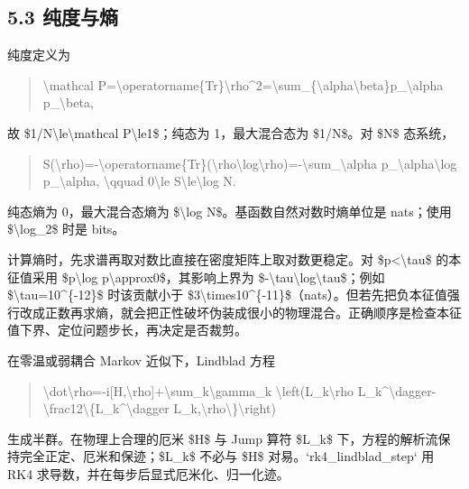\documentclass[UTF8,openany,11pt,fontset=fandol]{ctexbook}
\begin{document}
\subsection{\texorpdfstring{\textbf{5.3
纯度与熵}}{5.3 纯度与熵}}\label{ux7eafux5ea6ux4e0eux71b5}

纯度定义为

\begin{quote}
\textbackslash mathcal
P=\textbackslash operatorname\{Tr\}\textbackslash rho\^{}2=\textbackslash sum\_\{\textbackslash alpha\textbackslash beta\}p\_\textbackslash alpha
p\_\textbackslash beta,
\end{quote}

故 \$1/N\textbackslash le\textbackslash mathcal
P\textbackslash le1\$；纯态为 1，最大混合态为 \$1/N\$。对 \$N\$ 态系统，

\begin{quote}
S(\textbackslash rho)=-\textbackslash operatorname\{Tr\}(\textbackslash rho\textbackslash log\textbackslash rho)=-\textbackslash sum\_\textbackslash alpha
p\_\textbackslash alpha\textbackslash log p\_\textbackslash alpha,
\textbackslash qquad 0\textbackslash le
S\textbackslash le\textbackslash log N.
\end{quote}

纯态熵为 0，最大混合态熵为 \$\textbackslash log
N\$。基函数自然对数时熵单位是 nats；使用 \$\textbackslash log\_2\$ 时是
bits。

计算熵时，先求谱再取对数比直接在密度矩阵上取对数更稳定。对
\$p\textless\textbackslash tau\$ 的本征值采用 \$p\textbackslash log
p\textbackslash approx0\$，其影响上界为
\$-\textbackslash tau\textbackslash log\textbackslash tau\$；例如
\$\textbackslash tau=10\^{}\{-12\}\$ 时该贡献小于
\$3\textbackslash times10\^{}\{-11\}\$（nats）。但若先把负本征值强行改成正数再求熵，就会把正性破坏伪装成很小的物理混合。正确顺序是检查本征值下界、定位问题步长，再决定是否裁剪。

在零温或弱耦合 Markov 近似下，Lindblad 方程

\begin{quote}
\textbackslash dot\textbackslash rho=-i{[}H,\textbackslash rho{]}+\textbackslash sum\_k\textbackslash gamma\_k
\textbackslash left(L\_k\textbackslash rho
L\_k\^{}\textbackslash dagger-\textbackslash frac12\textbackslash\{L\_k\^{}\textbackslash dagger
L\_k,\textbackslash rho\textbackslash\}\textbackslash right)
\end{quote}

生成半群。在物理上合理的厄米 \$H\$ 与 Jump 算符 \$L\_k\$
下，方程的解析流保持完全正定、厄米和保迹；\$L\_k\$ 不必与 \$H\$
对易。`rk4\_lindblad\_step` 用 RK4
求导数，并在每步后显式厄米化、归一化迹。
\end{document}
